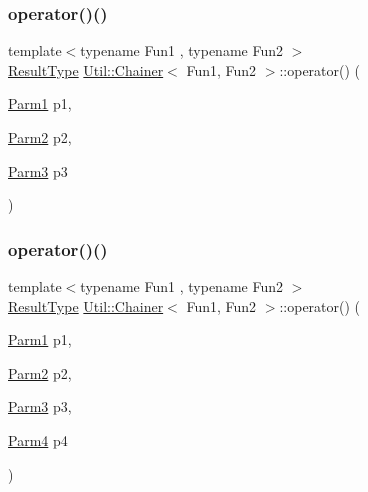 \mbox{\label{classUtil_1_1Chainer_af0f81081283f192626e5a83eb688f573}} 
\subsubsection{\texorpdfstring{operator()()}{operator()()}\hspace{0.1cm}{\footnotesize\ttfamily [12/18]}}
{\footnotesize\ttfamily template$<$typename Fun1 , typename Fun2 $>$ \\
\mbox{\hyperlink{classUtil_1_1Chainer_a2c8d88a77b8ba93eb915dc799ddafbb9}{Result\+Type}} \mbox{\hyperlink{classUtil_1_1Chainer}{Util\+::\+Chainer}}$<$ Fun1, Fun2 $>$\+::operator() (\begin{DoxyParamCaption}\item[{\mbox{\hyperlink{classUtil_1_1Chainer_a3e09b2267dabdd8d12070b09c47749c6}{Parm1}}}]{p1,  }\item[{\mbox{\hyperlink{classUtil_1_1Chainer_a1bfb0e8f35679278c85d232a74a107ff}{Parm2}}}]{p2,  }\item[{\mbox{\hyperlink{classUtil_1_1Chainer_ac28811d7153f7b7cf837f7b8626436c8}{Parm3}}}]{p3 }\end{DoxyParamCaption})\hspace{0.3cm}{\ttfamily [inline]}}

\mbox{\label{classUtil_1_1Chainer_aebe5bd1cb7c2523124ccdf2b406ff7d1}} 
\subsubsection{\texorpdfstring{operator()()}{operator()()}\hspace{0.1cm}{\footnotesize\ttfamily [13/18]}}
{\footnotesize\ttfamily template$<$typename Fun1 , typename Fun2 $>$ \\
\mbox{\hyperlink{classUtil_1_1Chainer_a2c8d88a77b8ba93eb915dc799ddafbb9}{Result\+Type}} \mbox{\hyperlink{classUtil_1_1Chainer}{Util\+::\+Chainer}}$<$ Fun1, Fun2 $>$\+::operator() (\begin{DoxyParamCaption}\item[{\mbox{\hyperlink{classUtil_1_1Chainer_a3e09b2267dabdd8d12070b09c47749c6}{Parm1}}}]{p1,  }\item[{\mbox{\hyperlink{classUtil_1_1Chainer_a1bfb0e8f35679278c85d232a74a107ff}{Parm2}}}]{p2,  }\item[{\mbox{\hyperlink{classUtil_1_1Chainer_ac28811d7153f7b7cf837f7b8626436c8}{Parm3}}}]{p3,  }\item[{\mbox{\hyperlink{classUtil_1_1Chainer_a82e756f3083e3883a05644425474f789}{Parm4}}}]{p4 }\end{DoxyParamCaption})\hspace{0.3cm}{\ttfamily [inline]}}

